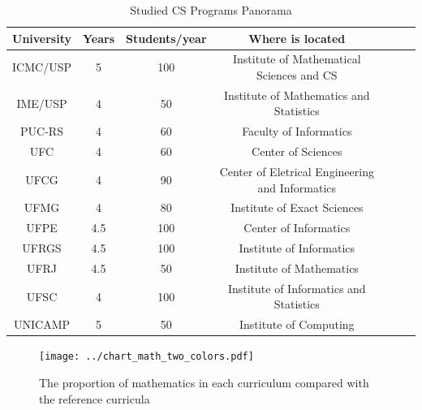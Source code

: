 \documentclass{beamer}
\begin{document}
\begin{frame}
\begin{table}
	\scriptsize
	\caption{Studied CS Programs Panorama}
    \begin{tabular}{|c|c|c|c|c|c|c|}
        \hline
        University   & Years & Students/year & Where is located                                   \\ \hline
        \rowcolor[gray]{.8}
        ICMC/USP     & 5     & 100   & Institute of Mathematical Sciences and CS        \\ 
        \rowcolor[gray]{.8}
        IME/USP      & 4     & 50    & Institute of Mathematics and Statistics          \\ 
        PUC-RS       & 4     & 60    & Faculty of Informatics                           \\ 
        UFC          & 4     & 60    & Center of Sciences                               \\ 
        UFCG         & 4     & 90    & Center of Eletrical Engineering and Informatics  \\ 
        UFMG         & 4     & 80    & Institute of Exact Sciences                      \\ 
        UFPE         & 4.5   & 100   & Center of Informatics                            \\ 
        UFRGS        & 4.5   & 100   & Institute of Informatics                         \\ 
        \rowcolor[gray]{.8}
        UFRJ         & 4.5   & 50    & Institute of Mathematics                         \\ 
        UFSC         & 4     & 100   & Institute of Informatics and Statistics          \\ 
        UNICAMP      & 5     & 50    & Institute of Computing                           \\
        \hline
    \end{tabular}
\end{table}
\end{frame}

\begin{frame}
\begin{figure}[!t]
\centering
\texttt{[image: ../chart\_math\_two\_colors.pdf]}
\caption{The proportion of mathematics in each curriculum compared with the reference curricula}
\label{chart_math}
\end{figure}

\end{frame}
\end{document}

